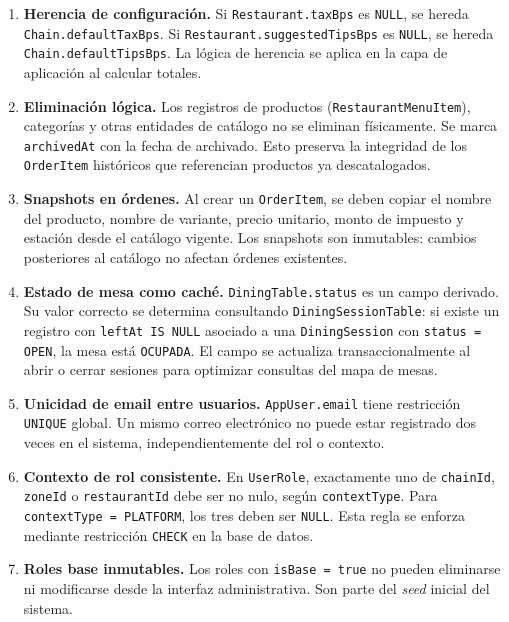 \documentclass[12pt, letterpaper]{article}
\begin{document}
\begin{enumerate}

  \item \textbf{Herencia de configuración.} Si \texttt{Restaurant.taxBps} es \texttt{NULL}, se hereda \texttt{Chain.defaultTaxBps}. Si \texttt{Restaurant.suggestedTipsBps} es \texttt{NULL}, se hereda \texttt{Chain.defaultTipsBps}. La lógica de herencia se aplica en la capa de aplicación al calcular totales.

  \item \textbf{Eliminación lógica.} Los registros de productos (\texttt{RestaurantMenuItem}), categorías y otras entidades de catálogo no se eliminan físicamente. Se marca \texttt{archivedAt} con la fecha de archivado. Esto preserva la integridad de los \texttt{OrderItem} históricos que referencian productos ya descatalogados.

  \item \textbf{Snapshots en órdenes.} Al crear un \texttt{OrderItem}, se deben copiar el nombre del producto, nombre de variante, precio unitario, monto de impuesto y estación desde el catálogo vigente. Los snapshots son inmutables: cambios posteriores al catálogo no afectan órdenes existentes.

  \item \textbf{Estado de mesa como caché.} \texttt{DiningTable.status} es un campo derivado. Su valor correcto se determina consultando \texttt{DiningSessionTable}: si existe un registro con \texttt{leftAt IS NULL} asociado a una \texttt{DiningSession} con \texttt{status = OPEN}, la mesa está \texttt{OCUPADA}. El campo se actualiza transaccionalmente al abrir o cerrar sesiones para optimizar consultas del mapa de mesas.

  \item \textbf{Unicidad de email entre usuarios.} \texttt{AppUser.email} tiene restricción \texttt{UNIQUE} global. Un mismo correo electrónico no puede estar registrado dos veces en el sistema, independientemente del rol o contexto.

  \item \textbf{Contexto de rol consistente.} En \texttt{UserRole}, exactamente uno de \texttt{chainId}, \texttt{zoneId} o \texttt{restaurantId} debe ser no nulo, según \texttt{contextType}. Para \texttt{contextType = PLATFORM}, los tres deben ser \texttt{NULL}. Esta regla se enforza mediante restricción \texttt{CHECK} en la base de datos.

  \item \textbf{Roles base inmutables.} Los roles con \texttt{isBase = true} no pueden eliminarse ni modificarse desde la interfaz administrativa. Son parte del \textit{seed} inicial del sistema.


\end{enumerate}
\end{document}
